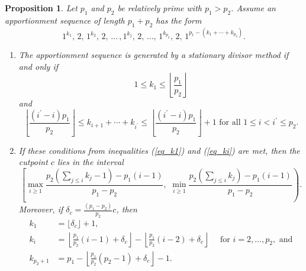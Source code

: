 \documentclass[pdflatex,sn-mathphys-num]{sn-jnl}
\theoremstyle{thmstyleone}%
\newtheorem{proposition}{Proposition}%
\theoremstyle{thmstyletwo}%
\theoremstyle{thmstylethree}%
\begin{document}
\begin{proposition}\label{prop:increasing}
Let $p_1$ and $p_2$ be relatively prime with $p_1>p_2$.  Assume an apportionment sequence of length $p_1 + p_2$ has the form 
$$1^{k_1}, \, 2, \,  1^{k_2}, \, 2,  \, \ldots \, , 1^{k_j}, \, 2, \, \ldots , \, 1^{k_{p_2}},  \, 2, \, 1^{p_1-(k_1+\cdots +k_{p_2})}.$$ 
\begin{enumerate} 
\item The apportionment sequence is generated by a stationary divisor method if and only if
   \begin{equation}\label{eq_k1} 1 \le k_1 \le \left\lfloor \frac{p_1}{p_2} \right\rfloor \end{equation} and
   \begin{equation}\label{eq_ki} \left\lfloor\frac{(i^\prime-i)p_1}{p_2}\right\rfloor \le k_{i+1}+ \cdots + k_{i^\prime} \le  \left\lfloor \frac{(i^\prime-i)p_1}{p_2}\right\rfloor + 1 \mbox{ for all } 1 \le i < i^\prime \le p_2. \end{equation}

\item If these conditions from inequalities (\ref{eq_k1}) and (\ref{eq_ki}) are met, then the cutpoint $c$ lies in the interval 
\begin{equation} \label{c_interval}
 \left[ \max_{i \ge 1} \frac{p_2(\sum_{j \le i} k_j-1) -p_1(i-1)}{p_1-p_2}, \,\, \min_{i \ge 1} \frac{p_2(\sum_{j \le i} k_j)-p_1(i-1)}{p_1-p_2}\right).\end{equation}
Moreover, if  $\delta_c =  \frac{(p_1-p_2)}{p_2}c$, then 
\begin{equation}
\begin{aligned}
 k_1 &=\lfloor  \delta_c \rfloor + 1, \\
 k_i & =\left\lfloor \frac{p_1}{p_2}(i-1) + \delta_c \right\rfloor - \left\lfloor \frac{p_1}{p_2}(i-2) + \delta_c \right\rfloor \quad \mbox{ for } i=2, \ldots, p_2, \text{ and}\\
k_{p_2+1} &= p_1 - \left\lfloor  \frac{p_1}{p_2}(p_2-1)+\delta_c \right\rfloor -1.\\
\end{aligned} 
\label{ki_formulas}
\end{equation}
\end{enumerate}
\end{proposition}
\end{document}
